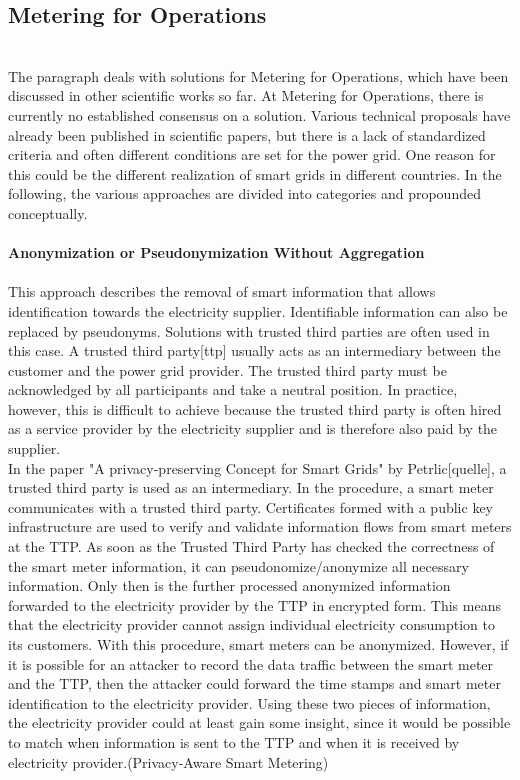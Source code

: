 \subsection{Metering for Operations}
\label{subsec:Meter_for_Op}
\\
The paragraph deals with solutions for Metering for Operations, which have been discussed in other scientific works so far. At Metering for Operations, there is currently no established consensus on a solution. Various technical proposals have already been published in scientific papers, but there is a lack of standardized criteria and often different conditions are set for the power grid. One reason for this could be the different realization of smart grids in different countries. In the following, the various approaches are divided into categories and propounded conceptually.\\
\\
\textbf{Anonymization or Pseudonymization
Without Aggregation}
\\
\\
This approach describes the removal of smart information that allows identification towards the electricity supplier. Identifiable information can also be replaced by pseudonyms. Solutions with trusted third parties are often used in this case. A trusted third party[ttp] usually acts as an intermediary between the customer and the power grid provider. The trusted third party must be acknowledged by all participants and take a neutral position. In practice, however, this is difficult to achieve because the trusted third party is often hired as a service provider by the electricity supplier and is therefore also paid by the supplier.\\
In the paper "A privacy-preserving Concept for Smart Grids" by Petrlic[quelle], a trusted third party is used as an intermediary. In the procedure, a smart meter communicates with a trusted third party. Certificates formed with a public key infrastructure are used to verify and validate information flows from smart meters at the TTP. As soon as the Trusted Third Party has checked the correctness of the smart meter information, it can pseudonomize/anonymize all necessary information. Only then is the further processed anonymized information forwarded to the electricity provider by the TTP in encrypted form. This means that the electricity provider cannot assign individual electricity consumption to its customers. With this procedure, smart meters can be anonymized. 
However, if it is possible for an attacker to record the data traffic between the smart meter and the TTP, then the attacker could forward the time stamps and smart meter identification to the electricity provider. Using these two pieces of information, the electricity provider could at least gain some insight, since it would be possible to match when information is sent to the TTP and when it is received by electricity provider.(Privacy-Aware Smart Metering) \\
